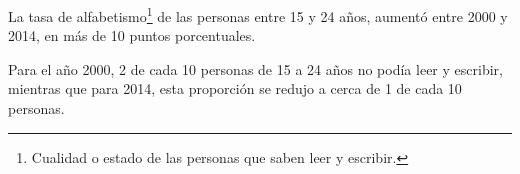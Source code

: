 La tasa de alfabetismo\footnote{Cualidad o estado de las personas que saben leer y escribir.} de las personas entre 15 y 24 años, aumentó entre 2000 y 2014, en más de 10 puntos porcentuales. 

Para el año 2000, 2 de cada 10 \mbox{personas} de 15 a 24 años no podía leer y escribir, mientras que para 2014, esta proporción se redujo a cerca de 1 de cada 10 personas.
